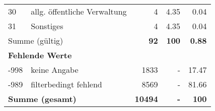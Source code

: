 \begin{longtable}{lXrrr}
        30 & \multicolumn{1}{X}{allg. öffentliche Verwaltung} & %
          \num{4} &
          \num[round-mode=places,round-precision=2]{4,35} &
          \num[round-mode=places,round-precision=2]{0,04} \\

        31 & \multicolumn{1}{X}{Sonstiges} & %
          \num{4} &
          \num[round-mode=places,round-precision=2]{4,35} &
          \num[round-mode=places,round-precision=2]{0,04} \\

     \midrule
     \multicolumn{2}{l}{Summe (gültig)} &
       \textbf{\num{92}} &
     \textbf{100} &
       \textbf{\num[round-mode=places,round-precision=2]{0,88}} \\
     \multicolumn{5}{l}{\textbf{Fehlende Werte}}\\
       -998 &
       keine Angabe &
         \num{1833} &
        - &
         \num[round-mode=places,round-precision=2]{17,47} \\
       -989 &
       filterbedingt fehlend &
         \num{8569} &
        - &
         \num[round-mode=places,round-precision=2]{81,66} \\
     \midrule
     \multicolumn{2}{l}{\textbf{Summe (gesamt)}} &
          \textbf{\num{10494}} &
        \textbf{-} &
        \textbf{100} \\
     \bottomrule
     \end{longtable}
     
